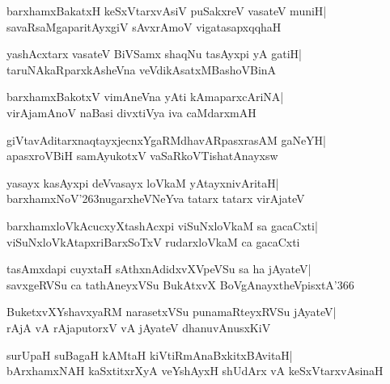 \documentclass[twoside,12pt,openright]{book}
\def\S{\char'263}
\newcounter{shloka}[chapter]
\begin{document}
\begin{shloka}%
barxhamxBakatxH keSxVtarxvAsiV puSakxreV vasateV muniH|\\
savaRsaMgaparitAyxgiV sAvxrAmoV vigatasapxqqhaH
\end{shloka}

\begin{shloka}%
yashAcxtarx vasateV BiVSamx shaqNu tasAyxpi yA gatiH|\\
taruNAkaRparxkAsheVna veVdikAsatxMBashoVBinA
\end{shloka}

\begin{shloka}%
barxhamxBakotxV vimAneVna yAti kAmaparxcAriNA|\\
virAjamAnoV naBasi divxtiVya iva caMdarxmAH
\end{shloka}

\begin{shloka}%
giVtavAditarxnaqtayxjecnxYgaRMdhavARpasxrasAM gaNeYH|\\
apasxroVBiH samAyukotxV vaSaRkoVTishatAnayxsw
\end{shloka}

\begin{shloka}%
yasayx kasAyxpi deVvasayx loVkaM yAtayxnivAritaH|\\
barxhamxNoV\S nugarxheVNeYva tatarx tatarx virAjateV
\end{shloka}

\begin{shloka}%
barxhamxloVkAcucxyXtashAcxpi viSuNxloVkaM sa gacaCxti|\\
viSuNxloVkAtapxriBarxSoTxV rudarxloVkaM ca gacaCxti
\end{shloka}

\begin{shloka}%
tasAmxdapi cuyxtaH sAthxnAdidxvXVpeVSu sa ha jAyateV|\\
savxgeRVSu ca tathAneyxVSu BukAtxvX BoVgAnayxtheVpisxtA\char'366
\end{shloka}

\begin{shloka}%
BuketxvXYshavxyaRM narasetxVSu punamaRteyxRVSu jAyateV|\\
rAjA vA rAjaputorxV vA jAyateV dhanuvAnusxKiV
\end{shloka}

\begin{shloka}%
surUpaH suBagaH kAMtaH kiVtiRmAnaBxkitxBAvitaH|\\
bArxhamxNAH kaSxtitxrXyA veYshAyxH shUdArx vA keSxVtarxvAsinaH
\end{shloka}
\end{document}
